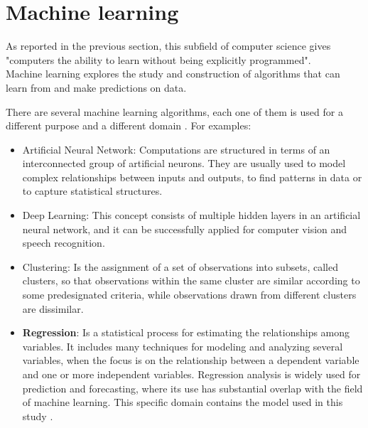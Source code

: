 \newpage


\section{Machine learning}
\vspace{-5mm}
\label{ML}
As reported in the previous section, this subfield of computer science gives "computers the ability to learn without being explicitly programmed". \\
Machine learning explores the study and construction of algorithms that can learn from and make predictions on data.

There are several machine learning algorithms, each one of them is used for a different purpose and a different domain \cite{wiki:ML}. For examples:
  \vspace{-5mm}
\begin{itemize}
 
  \item Artificial Neural Network: Computations are structured in terms of an interconnected group of artificial neurons. They are usually used to model complex relationships between inputs and outputs, to find patterns in data or to capture statistical structures. 
  
  \item Deep Learning: This concept consists of multiple hidden layers in an artificial neural network, and it can be successfully applied for computer vision and speech recognition.
  
  \item Clustering: Is the assignment of a set of observations into subsets, called clusters, so that observations within the same cluster are similar according to some predesignated criteria, while observations drawn from different clusters are dissimilar.
  
  \item \textbf{Regression}: Is a statistical process for estimating the relationships among variables. It includes many techniques for modeling and analyzing several variables, when the focus is on the relationship between a dependent variable and one or more independent variables. Regression analysis is widely used for prediction and forecasting, where its use has substantial overlap with the field of machine learning. This specific domain contains the model used in this study \cite{wiki:Regression}.
  
 \end{itemize}  

